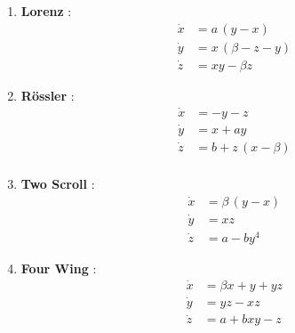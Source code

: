 \begin{enumerate}
    \item  \textbf{Lorenz} \cite{lorenz1963deterministic}:
    \begin{equation}
        \label{eq_6_Lorenz}
        \begin{aligned}
            \dot x &= a\, (y - x)  \\
            \dot y &= x\, (\beta - z -y) \\
            \dot z &= x y -\beta z
        \end{aligned}
    \end{equation}

    \item  \textbf{Rössler} \cite{Roessler1976}:
    \begin{equation}
        \label{eq_7_Ross}
        \begin{aligned}
            \dot x &= -y -z \\
            \dot y &= x + ay \\
            \dot z &= b +z \, (x-\beta)\\
        \end{aligned}
    \end{equation}

   

    \item \textbf{Two Scroll} \cite{TwoScroll}:
    \begin{equation}
        \label{eq_9_2_Scroll}
        \begin{aligned}
            \dot x &= \beta \, (y-x) \\
            \dot y &= x z \\
            \dot z &= a - by^4
        \end{aligned}
        \end{equation}

    \item \textbf{Four Wing} \cite{FourWing}:
    \begin{equation}
        \label{eq_10_4_Wing}
        \begin{aligned}
            \dot x &= \beta x +y +yz\\
            \dot y &= yz - xz \\
            \dot z &= a + bxy -z 
        \end{aligned}
    \end{equation}


\end{enumerate}
